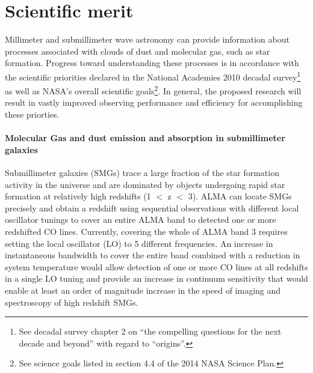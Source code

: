 

\section*{Scientific merit}
Millimeter and submillimeter wave astronomy can provide information about processes associated with clouds of dust and molecular gas, such as star formation. Progress toward understanding these processes is in accordance with the scientific priorities declared in the National Academies 2010 decadal survey\footnote{See decadal survey chapter 2 on ``the compelling questions for the next decade and beyond'' with regard to ``origins''.} as well as NASA’s overall scientific goals\footnote{See science goals listed in section 4.4 of the 2014 NASA Science Plan.}. In general, the proposed research will result in vastly improved observing performance and efficiency for accomplishing these priorties. 

\paragraph*{Molecular Gas and dust emission and absorption in submillimeter galaxies}
Submillimeter galaxies (SMGs) trace a large fraction of the star formation activity in the universe and are dominated by objects undergoing rapid star formation at relatively high redshifts (1 $<$ z $<$ 3). ALMA can locate SMGs precisely and obtain a redshift using sequential observations with different local oscillator tunings to cover an entire ALMA band to detected one or more redshifted CO lines. Currently, covering the whole of ALMA band 3 requires setting the local oscillator (LO) to 5 different frequencies. An increase in instantaneous bandwidth to cover the entire band combined with a reduction in system temperature would allow detection of one or more CO lines at all redshifts in a single LO tuning and provide an increase in continuum sensitivity that would enable at least an order of magnitude increase in the speed of imaging and spectroscopy of high redshift SMGs.


